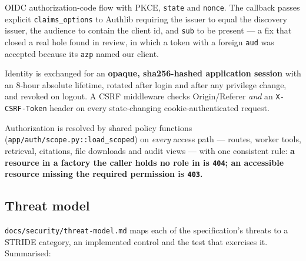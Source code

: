 \documentclass[11pt,a4paper]{article}
\begin{document}
OIDC authorization-code flow with PKCE, \texttt{state} and \texttt{nonce}. The
callback passes explicit \texttt{claims\_options} to Authlib requiring the
issuer to equal the discovery issuer, the audience to contain the client id, and
\texttt{sub} to be present --- a fix that closed a real hole found in review, in
which a token with a foreign \texttt{aud} was accepted because its \texttt{azp}
named our client.

Identity is exchanged for an \textbf{opaque, sha256-hashed application session}
with an 8-hour absolute lifetime, rotated after login and after any privilege
change, and revoked on logout. A CSRF middleware checks Origin/Referer
\emph{and} an \texttt{X-CSRF-Token} header on every state-changing
cookie-authenticated request.

Authorization is resolved by shared policy functions
(\texttt{app/auth/scope.py::load\_scoped}) on \emph{every} access path ---
routes, worker tools, retrieval, citations, file downloads and audit views ---
with one consistent rule: \textbf{a resource in a factory the caller holds no
role in is \texttt{404}; an accessible resource missing the required permission
is \texttt{403}.}

\subsection{Threat model}

\texttt{docs/security/threat-model.md} maps each of the specification's threats
to a STRIDE category, an implemented control and the test that exercises it.
Summarised:
\end{document}
